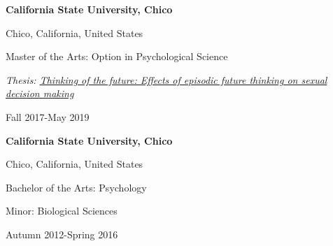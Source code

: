 \documentclass[
  16,
]{article}
\begin{document}
\begin{large}
  \begin{multicols}{2}
    \begin{flushleft}{\bf California State University, Chico}\end{flushleft}
    \begin{flushright}Chico, California, United States\end{flushright}
  \end{multicols}
  \vspace{-0.17cm}
  \begin{multicols}{2}
    \begin{flushleft}Master of the Arts: Option in Psychological Science \end{flushleft}
  \end{multicols}
  \vspace{-0.25cm}
  \textit{Thesis: \href{https://www.csuchico.edu/psy/_assets/documents/erm-repository/andrewithurburn_erm.pdf}{Thinking of the future: Effects of episodic future thinking on sexual decision making}}
  \begin{flushright}Fall 2017-May 2019\end{flushright}
\end{large}
\vspace{3pt}

\begin{large}
  \begin{multicols}{2}
    \begin{flushleft}{\bf California State University, Chico}\end{flushleft}
    \begin{flushright}Chico, California, United States\end{flushright}
  \end{multicols}
  \vspace{-0.17cm}
  \begin{multicols}{2}
    \begin{flushleft}Bachelor of the Arts: Psychology \end{flushleft}
    \begin{flushleft}Minor: Biological Sciences\end{flushleft}
    \begin{flushright}Autumn 2012-Spring 2016\end{flushright}
  \end{multicols}
  \vspace{-0.25cm}
  
\end{large}
\vspace{3pt}
\end{document}
